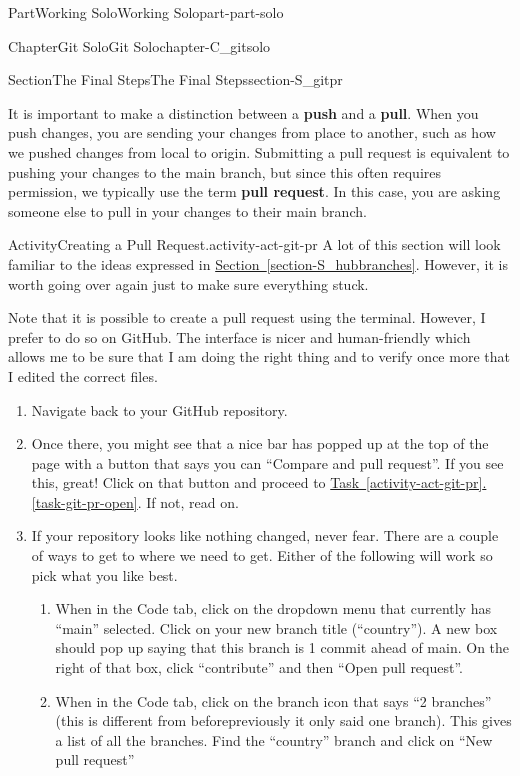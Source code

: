 \documentclass[oneside,10pt,]{book}
\newcommand{\xreffont}{\relax}
\newcommand{\terminology}[1]{\textbf{#1}}
\begin{document}
\begin{partptx}{Part}{Working Solo}{}{Working Solo}{}{}{part-part-solo}
\begin{chapterptx}{Chapter}{Git Solo}{}{Git Solo}{}{}{chapter-C_gitsolo}
\begin{sectionptx}{Section}{The Final Steps}{}{The Final Steps}{}{}{section-S_gitpr}
\par
It is important to make a distinction between a \terminology{push} and a \terminology{pull}. When you push changes, you are sending your changes from place to another, such as how we pushed changes from local to origin. Submitting a pull request is equivalent to pushing your changes to the main branch, but since this often requires permission, we typically use the term \terminology{pull request}. In this case, you are asking someone else to pull in your changes to their main branch.%
\begin{activity}{Activity}{Creating a Pull Request.}{activity-act-git-pr}%
%
A lot of this section will look familiar to the ideas expressed in \hyperref[section-S_hubbranches]{Section~{\xreffont\ref{section-S_hubbranches}}}. However, it is worth going over again just to make sure everything stuck.%
\par
Note that it is possible to create a pull request using the terminal. However, I prefer to do so on GitHub. The interface is nicer and human-friendly which allows me to be sure that I am doing the right thing and to verify once more that I edited the correct files.%
\begin{enumerate}[font=\bfseries,label=(\alph*),ref=\alph*]%
\item{}Navigate back to your GitHub repository.%
\item{}Once there, you might see that a nice bar has popped up at the top of the page with a button that says you can ``Compare and pull request''. If you see this, great! Click on that button and proceed to \hyperref[task-git-pr-open]{Task~{\xreffont\ref{activity-act-git-pr}}.{\xreffont\ref{task-git-pr-open}}}. If not, read on.%
\item\label{task-git-pr-create}If your repository looks like nothing changed, never fear. There are a couple of ways to get to where we need to get. Either of the following will work so pick what you like best.%
\begin{enumerate}
\item{}When in the Code tab, click on the dropdown menu that currently has ``main'' selected. Click on your new branch title (``country''). A new box should pop up saying that this branch is 1 commit ahead of main. On the right of that box, click ``contribute'' and then ``Open pull request''.%
\item{}When in the Code tab, click on the branch icon that says ``2 branches'' (this is different from before\textellipsis{}previously it only said one branch). This gives a list of all the branches. Find the ``country'' branch and click on ``New pull request''%

\end{enumerate}
\end{enumerate}
\end{activity}
\end{sectionptx}
\end{chapterptx}
\end{partptx}
\end{document}
